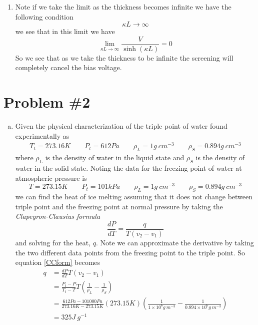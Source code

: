 \documentclass[11pt]{article}
\numberwithin{equation}{section}
\begin{document}
\begin{enumerate}[(1)]
\item Note if we take the limit as the thickness becomes infinite we have the following 
condition $$\kappa{L}\rightarrow\infty$$ we see that in this limit we have
$$\lim_{\kappa{L}\rightarrow\infty}\frac{V}{\sinh(\kappa{L})} = 0$$
So we see that as we take the thickness to be infinite the screening will completely cancel
the bias voltage.

\end{enumerate}

\pagebreak

\section{Problem \#2}
\begin{enumerate}[(a)]
\item Given the physical characterization of the triple point of water found experimentally
as
\begin{align*} 
T_t = 273.16\unit{K}\qquad P_t=612\unit{Pa}\qquad \rho_{L}=1\unit{g\ cm^{-3}}\qquad \rho_{S} = 0.894\unit{g\ cm^{-3}}
\end{align*} 
where $\rho_{L}$ is the density of water in the liquid state and $\rho_{S}$ is the density of
water in the solid state. Noting the data for the freezing point of water at atmospheric 
pressure is 
$$T = 273.15\unit{K}\qquad P_t=101\unit{kPa}\qquad \rho_{L}=1\unit{g\ cm^{-3}}\qquad \rho_{S} = 0.894\unit{g\ cm^{-3}}$$
we can find the heat of ice melting assuming that it does not change between triple point and 
the freezing point at normal pressure by taking the \emph{Clapeyron-Clausius formula}
\begin{equation}
\frac{dP}{dT} = \frac{q}{T(v_2-v_1)}
\label{CCform}
\end{equation}
and solving for the heat, $q$. Note we can approximate the derivative by taking the two 
different data points from the freezing point to the triple point. So equation \ref{CCform}
becomes
\begin{align*}
q &= \frac{dP}{dT}{T(v_2-v_1)}\\
&= \frac{P_t-P}{T_t-T}T\left(\frac{1}{\rho_L}-\frac{1}{\rho_S}\right)\\
&= \frac{612\unit{Pa}-101000\unit{Pa}}{273.16\unit{K}-273.15\unit{K}}(273.15\unit{K})\left(\frac{1}{1\times10^{6}\unit{g\ m^{-3}}}-\frac{1}{0.894\times10^{6}\unit{g\ m^{-3}}}\right)\\
&= 325\unit{J\ g^{-1}}
\end{align*}


\end{enumerate}
\end{document}
